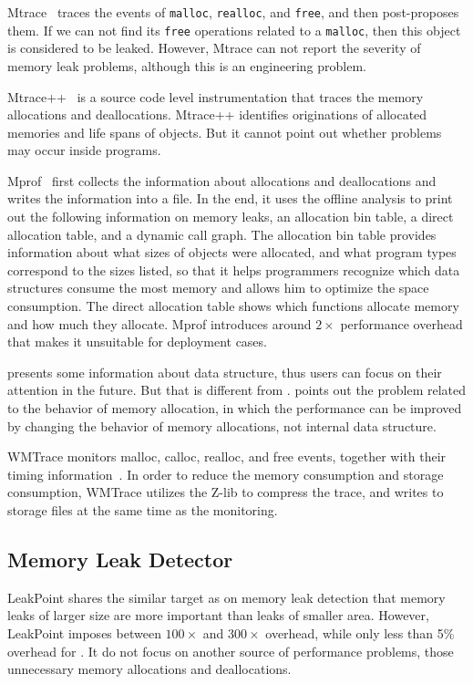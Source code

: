 Mtrace~\cite{mtrace} traces the events of \texttt{malloc}, \texttt{realloc}, and \texttt{free}, and then post-proposes them. If we can not find its \texttt{free} operations related to a \texttt{malloc}, then this object is considered to be leaked. However, Mtrace can not report the severity of memory leak problems, although this is an engineering problem.    

Mtrace++~\cite{Lee:2000:DMM:786772.787150} is a source code level instrumentation that traces the memory allocations and deallocations. Mtrace++ identifies originations of allocated memories and life spans of objects. But it cannot point out whether problems may occur inside programs. 

Mprof~\cite{Zorn:1988:MAP:894814} first collects the information about allocations and deallocations and writes the information into a file. In the end, it uses the offline analysis to print out the following information on memory leaks, an allocation bin table, a direct allocation table, and a dynamic call graph. The allocation bin table provides information about what sizes of objects were allocated, and what program types correspond to the sizes listed, so that it helps programmers recognize which data structures consume the most memory and allows him to optimize the space consumption. 
The direct allocation table shows which functions allocate memory and how much they allocate. Mprof introduces around $2\times$ performance overhead that makes it unsuitable for deployment cases. 


\MP{} presents some information about data structure, thus users can focus on their attention in the future. But that is different from \MP{}. \MP{} points out the problem related to the behavior of memory allocation, in which the performance can be improved by changing the behavior of memory allocations, not internal data structure. 
  


\cite{846583}

\cite{1190248}



WMTrace monitors malloc, calloc, realloc, and free events, together with their timing information~\cite{Perks:2011:WAP:2186355.2186369}. In order to reduce the memory consumption and storage consumption, WMTrace utilizes the Z-lib to compress the trace, and writes to storage files at the same time as the monitoring. 
 

\subsection{Memory Leak Detector}

LeakPoint\cite{Clause:2010:LPC:1806799.1806874} shares the similar target as \MP{} on memory leak detection that memory leaks of larger size
are more important than leaks of smaller area. However, LeakPoint imposes between $100\times$ and $300\times$ overhead, while only less than 5\% overhead for \MP{}. It do not focus on another source of performance problems, those unnecessary memory allocations and deallocations. 

